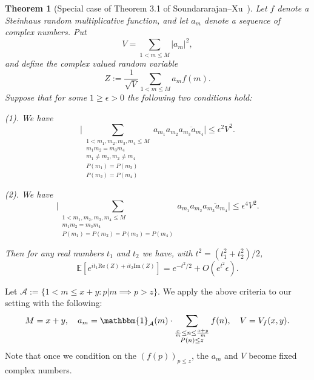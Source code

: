 \documentclass[12pt, notitlepage]{amsart}
\numberwithin{equation}{section}
\def\E{\mathbb E}
\def\CA{\mathcal{A}}
\newtheorem{theorem}{Theorem}[section]
\theoremstyle{remark}
\theoremstyle{definition}
\theoremstyle{remark}
\numberwithin{equation}{section}
\begin{document}
\begin{theorem}[Special case of Theorem 3.1 of Soundararajan--Xu~\cite{SoundXu}]\label{thm: SX} \label{thm: a_n} Let $f$ denote a Steinhaus random multiplicative function, and let $a_m$ denote a sequence of complex numbers.
Put 
$$ V= \sum_{1< m\le M} |a_m|^2,
$$ 
and define the complex valued random variable 
$$ 
Z:= \frac{1}{\sqrt{V}} \sum_{1<m\le M} a_m f(m). 
$$ 
Suppose that for some $1 \ge \epsilon >0$ the following two conditions hold:

(1).  We have 
$$ 
\Big| \sum_{\substack{ 1<m_1, m_2, m_3, m_4 \le M \\ m_1 m_2= m_3 m_4 \\ m_1 \neq m_3, m_2\neq m_4 \\ P(m_1)=P(m_3) \\ P(m_2)=P(m_4)}} a_{m_1} a_{m_2} 
\overline{a_{m_3}a_{m_4}} \Big| \le \epsilon^2 V^2.
$$ 

(2).  We have 
$$ 
\Big| \sum_{\substack{ 1<m_1, m_2, m_3, m_4 \le M  \\ m_1 m_2= m_3 m_4  \\ P(m_1)=P(m_2) =P(m_3)=P(m_4)}} a_{m_1} a_{m_2} 
\overline{a_{m_3}a_{m_4}} \Big| \le \epsilon^4 V^2.
$$ 

Then for any real numbers $t_1$ and $t_2$ we have, with $t^2 =(t_1^2+ t_2^2)/2$,
$$ 
\E[ e^{it_1 \text{Re}(Z) + it_2 \text{Im}(Z)} ]= e^{-t^2/2} + O(e^{t^2} \epsilon). 
$$ 
\end{theorem} 

Let $\CA:=\{1<m \le x+y: p|m \implies p>z\}$. 
We apply the above criteria to our setting with the following:
\[M=x+y, \quad a_m = \mathbbm{1}_{\CA}(m) \cdot \sum_{\substack{\frac{x}{m} \le n \le \frac{x+y}{m} \\ P(n)\le z}} f(n), \quad V= V_f(x, y). \]
Note that once we condition on the $(f(p))_{p\le z}$, the $a_m$ and $V$ become fixed complex numbers.
\end{document}
